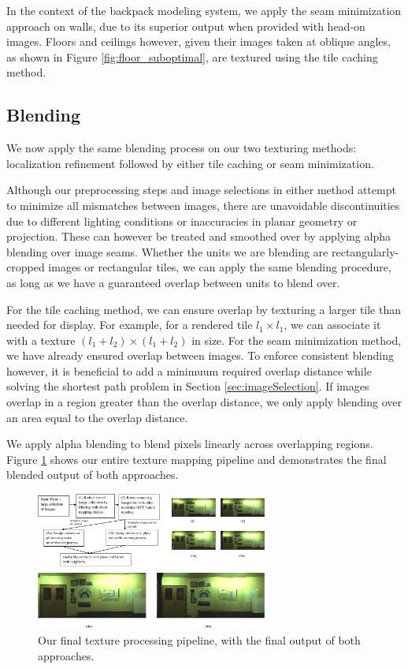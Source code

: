 \message{ !name(paper.tex)}\documentclass[10pt,twocolumn,letterpaper]{article}
\begin{document}
In the context of the backpack modeling system, we apply the seam
minimization approach on walls, due to its superior output when
provided with head-on images. Floors and ceilings however, given their
images taken at oblique angles, as shown in Figure \ref{fig:floor_suboptimal}, are textured using the tile caching method.

\subsection{Blending}
\label{sec:blending}
We now apply the same blending process on our two texturing methods:
localization refinement followed by either tile caching or seam
minimization.

Although our preprocessing steps and image selections in either method
attempt to minimize all mismatches between images, there are
unavoidable discontinuities due to different lighting conditions or
inaccuracies in planar geometry or projection. These can however be
treated and smoothed over by applying alpha blending over image seams.
Whether the units we are blending are rectangularly-cropped images or
rectangular tiles, we can apply the same blending procedure, as long
as we have a guaranteed overlap between units to blend over.

For the tile caching method, we can ensure overlap by texturing a
larger tile than needed for display. For example, for a rendered tile
$l_1 \times l_1$, we can associate it with a texture $(l_1 + l_2)
\times (l_1 + l_2)$ in size. For the seam minimization method, we have
already ensured overlap between images. To enforce consistent blending
however, it is beneficial to add a minimuum required overlap distance
while solving the shortest path problem in Section
\ref{sec:imageSelection}. If images overlap in a region greater than
the overlap distance, we only apply blending over an area equal to the
overlap distance.

We apply alpha blending to blend pixels
linearly across overlapping regions. Figure
\ref{fig:pipeline} shows our entire texture mapping pipeline and demonstrates the
final blended output of both approaches.

\begin{figure}
  \centering
  \includegraphics[width=3in]{pipeline.pdf}
  \caption{Our final texture processing pipeline, with the final
    output of both approaches.}
  \label{fig:pipeline}
\end{figure}
\end{document}
